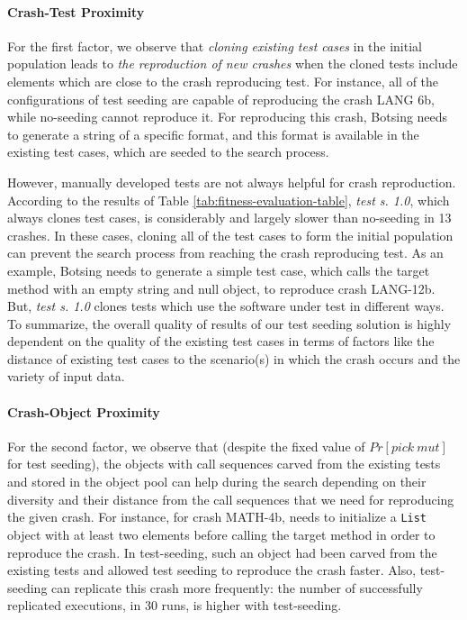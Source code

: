 \paragraph{Crash-Test Proximity} For the first factor, we observe that \emph{cloning existing test cases} in the initial population leads to \emph{the reproduction of new crashes} when the cloned tests include elements which are close to the crash reproducing test. For instance, all of the configurations of test seeding are capable of reproducing the crash LANG 6b, while no-seeding cannot reproduce it. For reproducing this crash, Botsing needs to generate a string of a specific format, and this format is available in the existing test cases, which are seeded to the search process.

However, manually developed tests are not always helpful for crash reproduction. According to the results of Table \ref{tab:fitness-evaluation-table}, \textit{test s. 1.0}, which always clones test cases, is considerably and largely slower than no-seeding in 13 crashes. In these cases, cloning all of the test cases to form the initial population can prevent the search process from reaching the crash reproducing test. As an example, Botsing needs to generate a simple test case, which calls the target method with an empty string and null object, to reproduce crash LANG-12b. But, \textit{test s. 1.0} clones tests which use the software under test in different ways.
To summarize, the overall quality of results of our test seeding solution is highly dependent on the quality of the existing test cases in terms of factors like the distance of existing test cases to the scenario(s) in which the crash occurs and the variety of input data.


\paragraph{Crash-Object Proximity} For the second factor, we observe that (despite the fixed value of $Pr[pick\ mut]$ for test seeding), the objects with call sequences carved from the existing tests and stored in the object pool can help during the search depending on their diversity and their distance from the call sequences that we need for reproducing the given crash. For instance, for crash MATH-4b, \botsing needs to initialize a \texttt{List} object with at least two elements before calling the target method in order to reproduce the crash. In test-seeding, such an object had been carved from the existing tests and allowed test seeding to reproduce the crash faster. Also, test-seeding can replicate this crash more frequently: the number of successfully replicated executions, in 30 runs, is higher with test-seeding.

